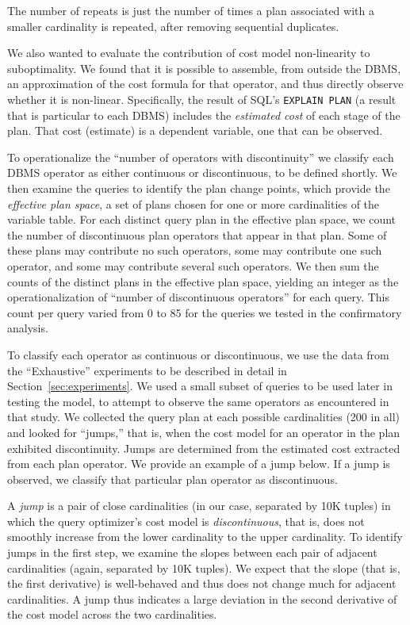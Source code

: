 \documentclass[prodmode,acmtods]{acmsmall}
\begin{document}
The number of repeats is just the number of times a plan associated with a
smaller cardinality is repeated, after removing sequential
duplicates. 

We also wanted to evaluate the contribution of cost model non-linearity to
suboptimality. We found that it is possible to assemble, from outside the
\hbox{DBMS}, an approximation of the cost formula for that operator, and thus
directly observe whether it is non-linear. Specifically, the result of SQL's
{\tt EXPLAIN PLAN} (a result that is particular to each \hbox{DBMS}) includes the
{\em estimated cost} of each stage of the plan. That cost (estimate) is a
dependent variable, one that can be observed.

To operationalize the ``number of operators with discontinuity'' we
classify each \hbox{DBMS} operator as either continuous or discontinuous, to be
defined shortly.  We then examine the queries
to identify the plan change points, which provide the {\em effective plan
  space}, a set of plans chosen for one or
more cardinalities of the variable table. For each distinct query plan in the
effective plan space, we
count the number of discontinuous plan operators that appear in that plan. Some of
these plans may contribute no such operators, some may contribute one such
operator, and some may contribute several such operators. We then sum the
counts of the distinct plans in the effective plan space, yielding an
integer as the operationalization of ``number of discontinuous operators''
for each query.  This count per query varied from 0 to 85 for the
queries we tested in the confirmatory analysis.

To classify each operator as continuous or discontinuous, we use the data
from the ``Exhaustive'' experiments to be described in detail in Section~\ref{sec:experiments}. We
used a small subset of queries to be used later in testing the model, to
attempt to observe the same operators as encountered in that
study. We
collected the query plan at each possible cardinalities (200 in all) and
looked for ``jumps,'' that is, when the cost model for an operator in the
plan exhibited discontinuity. Jumps are determined from the estimated cost
extracted from each plan operator. We provide an example of a jump below. If
a jump is observed, we classify that particular plan operator as
discontinuous.

A {\em jump} is a pair of close cardinalities (in our case, separated by 10K
tuples) in which the query optimizer's cost model is {\em discontinuous},
that is, does not smoothly increase from the lower cardinality to the upper
cardinality. To identify jumps in the first step, we examine the slopes
between each pair of adjacent cardinalities (again, separated by 10K
tuples). We expect that the slope (that is, the first derivative) is
well-behaved and thus does not change much for adjacent cardinalities. 
A jump thus indicates a large deviation in the second derivative of the 
cost model across the two cardinalities.
\end{document}
